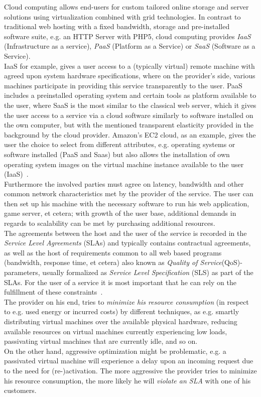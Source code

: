 \documentclass[a4paper]{llncs}
\begin{document}
Cloud computing allows end-users for custom tailored online storage and server solutions using virtualization combined with grid technologies. In contrast to traditional web hosting with a fixed bandwidth, storage and pre-installed software suite, e.g. an HTTP Server with PHP5, cloud computing provides \textit{IaaS} (Infrastructure as a service), \textit{PaaS} (Platform as a Service) or \textit{SaaS} (Software as a Service).\\
IaaS for example, gives a user access to a (typically virtual) remote machine with agreed upon system hardware specifications, where on the provider’s side, various machines participate in providing this service transparently to the user. PaaS includes a preinstalled operating system and certain tools as platform available to the user, where SaaS is the most similar to the classical web server, which it gives the user access to a service via a cloud software similarly to software installed on the own computer, but with the mentioned transparent elasticity provided in the background by the cloud provider. Amazon’s EC2 cloud, as an example, gives the user the choice to select from different attributes, e.g. operating systems or software installed (PaaS and Saas) but also allows the installation of own operating system images on the virtual machine instance available to the user (IaaS)~\cite{Graubner}.\\
Furthermore the involved parties must agree on latency, bandwidth and other common network characteristics met by the provider of the service. The user can then set up his machine with the necessary software to run his web application, game server, et cetera; with growth of the user base, additional demands in regards to scalability can be met by purchasing additional resources.\\
The agreements between the host and the user of the service is recorded in the \textit{Service Level Agreements} (SLAs) and typically contains contractual agreements, as well as the host of requirements common to all web based programs (bandwidth, response time, et cetera) also known as \textit{Quality of Service}(QoS)-parameters, usually formalized as \textit{Service Level Specification} (SLS) as part of the SLAs. For the user of a service it is most important that he can rely on the fulfillment of these constraints~\cite{Undheim11}.\\

The provider on his end, tries to \textit{minimize his resource consumption} (in respect to e.g. used energy or incurred costs) by different techniques, as e.g. smartly distributing virtual machines over the available physical hardware, reducing available resources on virtual machines currently experiencing low loads, passivating virtual machines that are currently idle, and so on.\\
On the other hand, aggressive optimization might be problematic, e.g. a passivated virtual machine will experience a delay upon an incoming request due to the need for (re-)activation. The more aggressive the provider tries to minimize his resource consumption, the more likely he will \textit{violate an SLA} with one of his customers.\\
\end{document}
